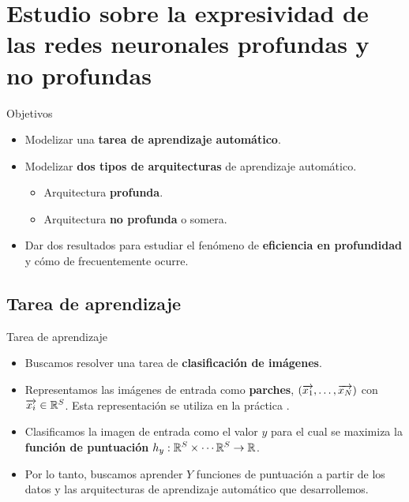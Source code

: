 \section{Estudio sobre la expresividad de las redes neuronales profundas y no profundas}

\begin{frame}{Objetivos}
	\begin{itemize}
		\item Modelizar una \textbf{tarea de aprendizaje automático}.
		\item Modelizar \textbf{dos tipos de arquitecturas} de aprendizaje automático.
		      \begin{itemize}
			      \item Arquitectura \textbf{profunda}.
			      \item Arquitectura \textbf{no profunda} o somera.
		      \end{itemize}
		\item Dar dos resultados para estudiar el fenómeno de \textbf{eficiencia en profundidad} y cómo de frecuentemente ocurre.
	\end{itemize}
\end{frame}

\subsection{Tarea de aprendizaje}
\begin{frame}{Tarea de aprendizaje}

	\begin{itemize}
		\item Buscamos resolver una tarea de \textbf{clasificación de imágenes}.
		\item Representamos las imágenes de entrada como \textbf{parches}, $(\overrightarrow{x_1}, \ldots, \overrightarrow{x_N})$ con $\overrightarrow{x_i} \in \mathbb{R}^S$. Esta representación se utiliza en la práctica \cite{matematicas:vit}.
		\item Clasificamos la imagen de entrada como el valor $y$ para el cual se maximiza la \textbf{función de puntuación} $h_y: \mathbb{R}^S \times \cdots \mathbb{R}^S \to \mathbb{R}$.
		\item Por lo tanto, buscamos aprender $Y$ funciones de puntuación a partir de los datos y las arquitecturas de aprendizaje automático que desarrollemos.
	\end{itemize}

\end{frame}

